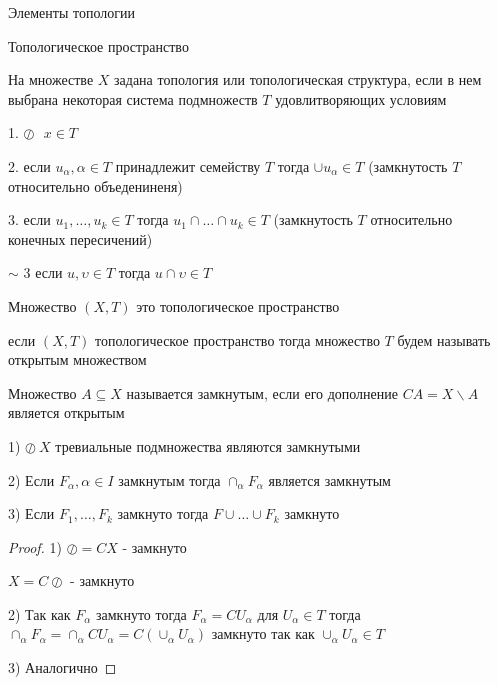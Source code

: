 \begin{title}
  Элементы топологии
\end{title}

\begin{title}[\Large]
  Топологическое пространство
\end{title}

\begin{define}
  На множестве $X$ задана топология или топологическая структура, если в нем
  выбрана некоторая система подмножеств $T$ удовлитворяющих условиям

  1. $\oslash ~~~ x \in T$

  2. если $u_{\alpha}, \alpha \in T$ принадлежит семейству $T$ тогда
  $\cup u_{\alpha} \in T$ (замкнутость $T$ относительно объедениненя)

  3. если $u_1, \ldots, u_k \in T$ тогда $u_1 \cap \ldots \cap u_k \in T$
  (замкнутость $T$ относительно конечных пересичений)

  $\sim$ 3 если $u, \upsilon \in T$ тогда $u \cap \upsilon \in T$
\end{define}

\begin{define}
  Множество $(X, T)$ это топологическое пространство
\end{define}

если $(X, T)$ топологическое пространство тогда множество $T$ будем называть
открытым множеством

\begin{define}
  Множество $A \subseteq X$ называется замкнутым, если его дополнение
  $CA = X \backslash A$ является открытым
\end{define}

\begin{block}[Свойства]
  1) $\oslash ~ X$ тревиальные подмножества являются замкнутыми

  2) Если $F_{\alpha}, \alpha \in I$ замкнутым тогда $\cap_{\alpha}F_{\alpha}$
  является замкнутым

  3) Если $F_1, \ldots, F_k$ замкнуто тогда $F \cup \ldots \cup F_k$ замкнуто
\end{block}

\begin{proof}
  1) $\oslash = CX$ - замкнуто

  $X = C \oslash$ - замкнуто

  2) Так как $F_{\alpha}$ замкнуто тогда $F_{\alpha} = CU_{\alpha}$ для
  $U_{\alpha} \in T$ тогда $\cap_{\alpha}F_{\alpha} = \cap_{\alpha}CU_{\alpha}
  = C(\cup_{\alpha}U_{\alpha})$ замкнуто так как $\cup_{\alpha} U_{\alpha}
  \in T$

  3) Аналогично
\end{proof}

